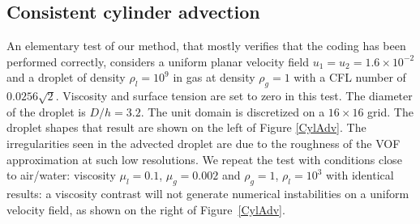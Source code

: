 \subsection{Consistent cylinder advection}

An elementary test of our method, that mostly verifies that the coding 
has been performed correctly, considers a uniform planar velocity field 
$u_1 = u_2 = 1.6 \times 10^{-2}$ and a droplet of density $\rho_l = 10^9$ 
in gas at density $\rho_g=1$ with a CFL number of $0.0256 \sqrt 2$.  
Viscosity and surface tension are set to zero in this test.  
The diameter of the droplet is $D/h=3.2$. The unit domain is discretized on a 
$16 \times 16$ grid. The droplet shapes that result are shown on the left 
of Figure \ref{CylAdv}. 
The irregularities seen in the advected droplet are due to the roughness of 
the VOF approximation at such low resolutions. We repeat the test with 
conditions close to air/water: viscosity $\mu_l = 0.1$, $\mu_g=0.002$ 
and  $\rho_g=1$, $\rho_l = 10^3$ with identical results: a viscosity contrast 
will not generate numerical instabilities on a uniform velocity field, as shown 
on the right of Figure~\ref{CylAdv}. 
